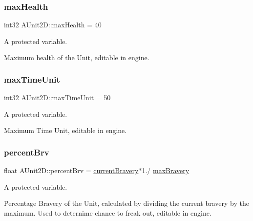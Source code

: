 \subsubsection{\texorpdfstring{max\+Health}{maxHealth}}
{\footnotesize\ttfamily int32 A\+Unit2\+D\+::max\+Health = 40\hspace{0.3cm}{\ttfamily [protected]}}



A protected variable. 

Maximum health of the Unit, editable in engine. \hypertarget{class_a_unit2_d_a0a8041a5fc46bd09fed79303fbcd3ce5}{}\label{class_a_unit2_d_a0a8041a5fc46bd09fed79303fbcd3ce5} 
\subsubsection{\texorpdfstring{max\+Time\+Unit}{maxTimeUnit}}
{\footnotesize\ttfamily int32 A\+Unit2\+D\+::max\+Time\+Unit = 50\hspace{0.3cm}{\ttfamily [protected]}}



A protected variable. 

Maximum Time Unit, editable in engine. \hypertarget{class_a_unit2_d_a837bd3a0faaf2ebd2796de9a16da8fa0}{}\label{class_a_unit2_d_a837bd3a0faaf2ebd2796de9a16da8fa0} 
\subsubsection{\texorpdfstring{percent\+Brv}{percentBrv}}
{\footnotesize\ttfamily float A\+Unit2\+D\+::percent\+Brv = \hyperlink{class_a_unit2_d_aee9f4f0703e027df353d51811befb1c3}{current\+Bravery}$\ast$1./ \hyperlink{class_a_unit2_d_a5e26bf8a80a9363d3538b1e1f675fb61}{max\+Bravery}\hspace{0.3cm}{\ttfamily [protected]}}



A protected variable. 

Percentage Bravery of the Unit, calculated by dividing the current bravery by the maximum. Used to deternime chance to freak out, editable in engine. \hypertarget{class_a_unit2_d_a731e52449dba6368b509b78ac95c0dc0}{}\label{class_a_unit2_d_a731e52449dba6368b509b78ac95c0dc0} 

